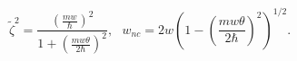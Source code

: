 \begin{equation}
\tilde{\zeta}^{2}=\frac{\left(  \frac{mw}{\hbar}\right)  ^{2}}{1+\left(
\frac{mw\theta}{2\hbar}\right)  ^{2}},\text{ \ }w_{nc}=2w\left(  1-\left(
\frac{mw\theta}{2\hbar}\right)  ^{2}\right)  ^{1/2}.\label{49}%
\end{equation}

